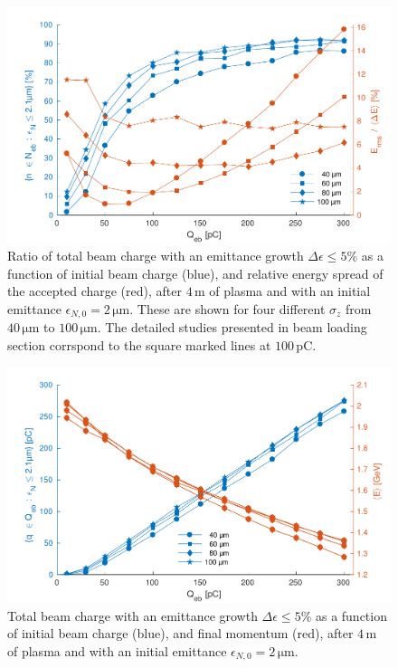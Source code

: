 \documentclass[aps,prstab,reprint,amsmath,amssymb,groupedaddress]{revtex4-1}
\newcommand{\unit}[1]{\,\mathrm{#1}}
\begin{document}
\begin{figure}[hbt]
    \includegraphics[width=\linewidth,trim={2mm 0mm 2mm 0mm},clip]{figures/beamQuality}
    \caption{\label{Fig:BeamQ} Ratio of total beam charge with an emittance growth $\Delta\epsilon \leq 5\%$ as a
        function of initial beam charge (blue), and relative energy spread of the accepted charge (red), after
        $4\unit{m}$ of plasma and with an initial emittance $\epsilon_{N,0}=2\unit{\mu m}$. These are shown for four
        different $\sigma_{z}$ from $40\unit{\mu m}$ to $100\unit{\mu m}$. The detailed studies presented in beam
        loading section corrspond to the square marked lines at $100\unit{pC}$.}
\end{figure}

\begin{figure}[hbt]
    \includegraphics[width=\linewidth,trim={2mm 0mm 2mm 0mm},clip]{figures/beamQualityAbs}
    \caption{\label{Fig:BeamQAbs} Total beam charge with an emittance growth $\Delta\epsilon \leq 5\%$ as a function of
        initial beam charge (blue), and final momentum (red), after $4\unit{m}$ of plasma and with an initial emittance
        $\epsilon_{N,0}=2\unit{\mu m}$.}
\end{figure}
\end{document}
